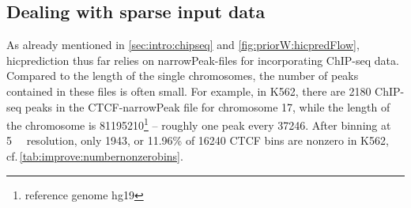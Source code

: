 \subsection{Dealing with sparse input data} \label{sec:improve:peakDensity}
As already mentioned in \autoref{sec:intro:chipseq} and \autoref{fig:priorW:hicpredFlow}, 
hicprediction thus far relies on narrowPeak-files for incorporating ChIP-seq data.
Compared to the length of the single chromosomes, 
the number of peaks contained in these files is often small.
For example, in K562, there are 2180 ChIP-seq peaks in the CTCF-narrowPeak file for chromosome 17, 
while the length of the chromosome is \SI{81195210}{\bp}\footnote{reference genome hg19} -- roughly one peak every \SI{37246}{\bp}.
After binning at \SI{5}{\kilo\bp} resolution, only 1943, or 11.96\% of \num{16240} CTCF bins are nonzero in K562, 
cf.\,\autoref{tab:improve:numbernonzerobins}.
